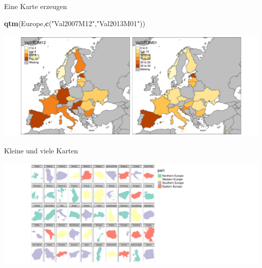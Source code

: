 \documentclass[ignorenonframetext,]{beamer}
\newenvironment{Shaded}{\begin{snugshade}}{\end{snugshade}}
\newcommand{\KeywordTok}[1]{\textcolor[rgb]{0.13,0.29,0.53}{\textbf{#1}}}
\newcommand{\DataTypeTok}[1]{\textcolor[rgb]{0.13,0.29,0.53}{#1}}
\newcommand{\DecValTok}[1]{\textcolor[rgb]{0.00,0.00,0.81}{#1}}
\newcommand{\StringTok}[1]{\textcolor[rgb]{0.31,0.60,0.02}{#1}}
\newcommand{\OtherTok}[1]{\textcolor[rgb]{0.56,0.35,0.01}{#1}}
\newcommand{\OperatorTok}[1]{\textcolor[rgb]{0.81,0.36,0.00}{\textbf{#1}}}
\newcommand{\NormalTok}[1]{#1}
\begin{document}
\begin{frame}[fragile]{Eine Karte erzeugen}

\begin{Shaded}
\begin{Highlighting}[]
\KeywordTok{qtm}\NormalTok{(Europe,}\KeywordTok{c}\NormalTok{(}\StringTok{"Val2007M12"}\NormalTok{,}\StringTok{"Val2013M01"}\NormalTok{))}
\end{Highlighting}
\end{Shaded}

\includegraphics{tmap_files/figure-beamer/unnamed-chunk-53-1.pdf}

\end{frame}

\begin{frame}[fragile]{Kleine und viele Karten}

\begin{Shaded}
\end{Shaded}

\includegraphics{tmap_files/figure-beamer/unnamed-chunk-55-1.pdf}

\end{frame}
\end{document}
